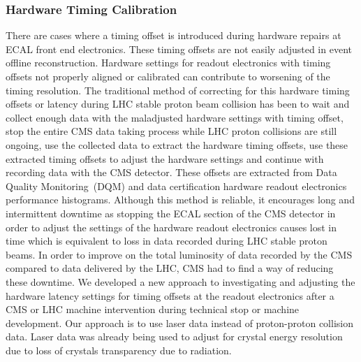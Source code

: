\begin{center}
{}
\label{fig:TimeCalib}
\end{center}

\subsubsection{Hardware Timing Calibration}
There are cases where a timing offset is introduced during hardware repairs at ECAL front end electronics. These timing offsets are not easily adjusted in event offline reconstruction. Hardware settings for readout electronics with timing offsets not properly aligned or calibrated can contribute to worsening of the timing resolution. The traditional method of correcting for this hardware timing offsets or latency during LHC  stable proton beam collision has been to wait and collect enough data with the maladjusted hardware settings with timing offset, stop the entire CMS data taking process while LHC proton collisions are still ongoing, use the collected data to extract the hardware timing offsets, use these extracted timing offsets to adjust the hardware settings and continue with recording data with the CMS detector. These offsets are extracted from Data Quality Monitoring~(DQM) and data certification hardware readout electronics performance histograms. Although this method is reliable, it encourages long and intermittent downtime as stopping the ECAL section of the CMS detector in order to adjust the settings of the hardware readout electronics causes lost in time which is equivalent to loss in data recorded during LHC stable proton beams. In order to improve on the total luminosity of data recorded by the CMS compared to data delivered by the LHC, CMS had to find a way of reducing these downtime. We developed a new approach to investigating and adjusting the hardware latency settings for timing offsets at the readout electronics after a CMS or LHC machine intervention during technical stop or machine development. Our approach is to use laser data  instead of proton-proton collision data. Laser data was already being used to adjust for crystal energy resolution due to loss of crystals transparency due to radiation. 
